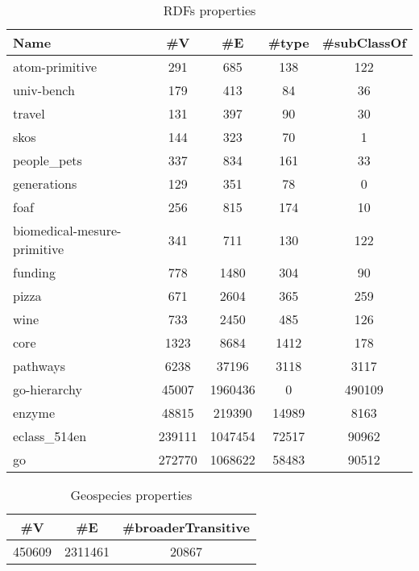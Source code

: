 {\setlength{\tabcolsep}{0.4em}
\begin{table*}[h]
\caption{RDFs properties}
\label{tbl:propRDF}
\begin{tabular}{| l | c | c | c | c |}
    \hline
    Name                  & \#V    & \#E     & \#type &\#subClassOf \\
    \hline
    \hline
    atom-primitive				& 291		& 685		& 138	& 122	\\
    univ-bench					& 179		& 413		& 84		& 36		\\
    travel						& 131		& 397		& 90		& 30		\\
    skos							& 144		& 323		& 70		& 1		\\
    people\_pets					& 337		& 834		& 161	& 33		\\
    generations					& 129		& 351		& 78		& 0		\\
    foaf							& 256		& 815		& 174	& 10		\\
    biomedical-mesure-primitive	& 341		& 711		& 130	& 122	\\
    funding						& 778		& 1480		& 304	& 90               \\
    pizza						& 671		& 2604		& 365	& 259              \\
    wine							& 733		& 2450		& 485	& 126              \\
    core							& 1323		& 8684		& 1412	& 178              \\
    pathways						& 6238		& 37196		& 3118 	& 3117             \\
    go-hierarchy					& 45007		& 1960436	& 0		& 490109           \\
    enzyme						& 48815		& 219390		& 14989	& 8163             \\
    eclass\_514en				& 239111		& 1047454	& 72517	& 90962            \\
    go							& 272770		& 1068622	& 58483	& 90512            \\
    \hline
  \end{tabular}
\end{table*}
}


{\setlength{\tabcolsep}{0.4em}
\begin{table*}[h]
\caption{Geospecies properties}
\label{tbl:propGeo}
\begin{tabular}{| c | c | c |}
    \hline
    \#V    & \#E     & \#broaderTransitive \\
    \hline
    \hline
	450609 & 2311461 & 20867 \\
    \hline
  \end{tabular}
\end{table*}
}

